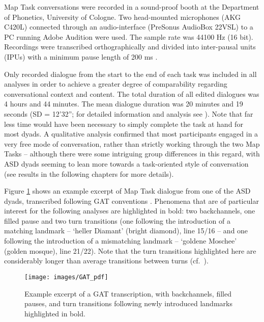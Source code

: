 Map Task conversations were recorded in a sound-proof booth at the Department of Phonetics, University of Cologne. Two head-mounted microphones (AKG C420L) connected through an audio-interface (PreSonus AudioBox 22VSL) to a PC running Adobe Audition were used. The sample rate was 44100 Hz (16 bit). Recordings were transcribed orthographically and divided into inter-pausal units (IPUs) with a minimum pause length of 200 ms \citep{dejongChoosingThresholdSilent2013,goldman-eislerPsycholinguisticsExperimentsSpontaneous1968,choContributionSilentPauses2006}.

Only recorded dialogue from the start to the end of each task was included in all analyses in order to achieve a greater degree of comparability regarding conversational context and content. The total duration of all edited dialogues was 4 hours and 44 minutes. The mean dialogue duration was 20 minutes and 19 seconds (SD = 12'32''; for detailed information and analysis see ). Note that far less time would have been necessary to simply complete the task at hand for most dyads. A qualitative analysis confirmed that most participants engaged in a very free mode of conversation, rather than strictly working through the two Map Tasks -- although there were some intriguing group differences in this regard, with ASD dyads seeming to lean more towards a task-oriented style of conversation (see results in the following chapters for more details).

Figure \ref{fig:MapTaskGAT} shows an example excerpt of Map Task dialogue from one of the ASD dyads, transcribed following GAT conventions \citep[see][]{couper-kuhlenSystemTranscribingTalkininteraction2011}. Phenomena that are of particular interest for the following analyses are highlighted in bold: two backchannels, one filled pause and two turn transitions (one following the introduction of a matching landmark -- `heller Diamant' (bright diamond), line 15/16 -- and one following the introduction of a mismatching landmark -- `goldene Moschee' (golden mosque), line 21/22). Note that the turn transitions highlighted here are considerably longer than average transitions between turns (cf.~).



\begin{figure}
	
	{\centering \texttt{[image: images/GAT\_pdf]}
		
	}
	
	\caption{Example excerpt of a GAT transcription, with backchannels, filled pauses, and turn transitions following newly introduced landmarks highlighted in bold.}\label{fig:MapTaskGAT}
\end{figure}




